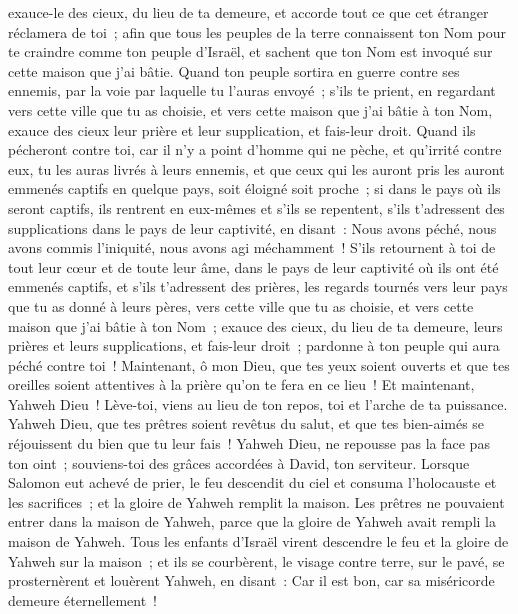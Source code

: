 \begin{multicols}{2}
exauce-le des cieux, du lieu de ta demeure, et accorde tout ce que cet étranger réclamera de toi~; afin que tous les peuples de la terre connaissent ton Nom pour te craindre comme ton peuple d'Israël, et sachent que ton Nom est invoqué sur cette maison que j'ai bâtie.
Quand ton peuple sortira en guerre contre ses ennemis, par la voie par laquelle tu l'auras envoyé~; s'ils te prient, en regardant vers cette ville que tu as choisie, et vers cette maison que j'ai bâtie à ton Nom,
exauce des cieux leur prière et leur supplication, et fais-leur droit.
Quand ils pécheront contre toi, car il n'y a point d'homme qui ne pèche, et qu'irrité contre eux, tu les auras livrés à leurs ennemis, et que ceux qui les auront pris les auront emmenés captifs en quelque pays, soit éloigné soit proche~;
si dans le pays où ils seront captifs, ils rentrent en eux-mêmes et s'ils se repentent, s'ils t'adressent des supplications dans le pays de leur captivité, en disant~: Nous avons péché, nous avons commis l'iniquité, nous avons agi méchamment~!
S'ils retournent à toi de tout leur cœur et de toute leur âme, dans le pays de leur captivité où ils ont été emmenés captifs, et s'ils t'adressent des prières, les regards tournés vers leur pays que tu as donné à leurs pères, vers cette ville que tu as choisie, et vers cette maison que j'ai bâtie à ton Nom~;
exauce des cieux, du lieu de ta demeure, leurs prières et leurs supplications, et fais-leur droit~; pardonne à ton peuple qui aura péché contre toi~!
Maintenant, ô mon Dieu, que tes yeux soient ouverts et que tes oreilles soient attentives à la prière qu'on te fera en ce lieu~!
Et maintenant, Yahweh Dieu~! Lève-toi, viens au lieu de ton repos, toi et l'arche de ta puissance. Yahweh Dieu, que tes prêtres soient revêtus du salut, et que tes bien-aimés se réjouissent du bien que tu leur fais~!
Yahweh Dieu, ne repousse pas la face pas ton oint~; souviens-toi des grâces accordées à David, ton serviteur.
\VerseOne{}Lorsque Salomon eut achevé de prier, le feu descendit du ciel et consuma l'holocauste et les sacrifices~; et la gloire de Yahweh remplit la maison.
Les prêtres ne pouvaient entrer dans la maison de Yahweh, parce que la gloire de Yahweh avait rempli la maison de Yahweh.
Tous les enfants d'Israël virent descendre le feu et la gloire de Yahweh sur la maison~; et ils se courbèrent, le visage contre terre, sur le pavé, se prosternèrent et louèrent Yahweh, en disant~: Car il est bon, car sa miséricorde demeure éternellement~!

\end{multicols}
